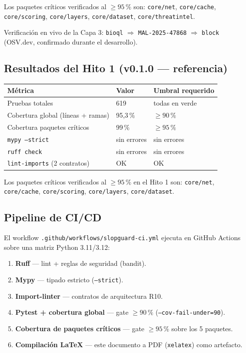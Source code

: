 \documentclass[11pt,a4paper]{article}
\begin{document}
Los paquetes críticos verificados al $\ge 95\,\%$ son:
\texttt{core/net}, \texttt{core/cache}, \texttt{core/scoring},
\texttt{core/layers}, \texttt{core/dataset}, \texttt{core/threatintel}.

Verificación en vivo de la Capa 3: \texttt{bioql} $\Rightarrow$
\texttt{MAL-2025-47868} $\Rightarrow$ \texttt{block} (OSV.dev, confirmado
durante el desarrollo).

\subsection{Resultados del Hito 1 (v0.1.0 --- referencia)}

\begin{center}
\small
\begin{tabular}{@{}lll@{}}
\toprule
\textbf{Métrica} & \textbf{Valor} & \textbf{Umbral requerido} \\
\midrule
Pruebas totales & 619 & todas en verde \\
Cobertura global (líneas + ramas) & 95{,}3\,\% & $\geq 90\,\%$ \\
Cobertura paquetes críticos & 99\,\% & $\geq 95\,\%$ \\
\texttt{mypy --strict} & sin errores & sin errores \\
\texttt{ruff check} & sin errores & sin errores \\
\texttt{lint-imports} (2 contratos) & OK & OK \\
\bottomrule
\end{tabular}
\end{center}

Los paquetes críticos verificados al $\ge 95\,\%$ en el Hito 1 son:
\texttt{core/net}, \texttt{core/cache}, \texttt{core/scoring},
\texttt{core/layers}, \texttt{core/dataset}.

\subsection{Pipeline de CI/CD}

El workflow \texttt{.github/workflows/slopguard-ci.yml} ejecuta en GitHub Actions
sobre una matriz Python 3.11/3.12:

\begin{enumerate}[nosep]
  \item \textbf{Ruff} — lint + reglas de seguridad (bandit).
  \item \textbf{Mypy} — tipado estricto (\texttt{--strict}).
  \item \textbf{Import-linter} — contratos de arquitectura R10.
  \item \textbf{Pytest + cobertura global} — gate $\ge 90\,\%$ (\texttt{--cov-fail-under=90}).
  \item \textbf{Cobertura de paquetes críticos} — gate $\ge 95\,\%$ sobre los 5 paquetes.
  \item \textbf{Compilación LaTeX} — este documento a PDF (\texttt{xelatex}) como artefacto.
\end{enumerate}
\end{document}
